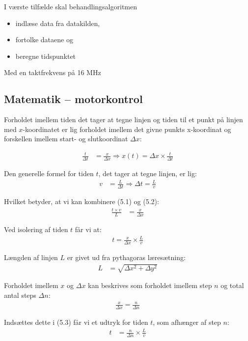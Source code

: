 I værste tilfælde skal behandlingsalgoritmen
\begin{itemize}
\item indlæse data fra datakilden,
\item fortolke dataene og
\item beregne tidspunktet
\end{itemize}

Med en taktfrekvens på 16 MHz

\subsection{Matematik -- motorkontrol}

Forholdet imellem tiden det tager at tegne linjen og tiden til et
punkt på linjen med $x$-koordinatet er lig forholdet imellem det givne
punkts x-koordinat og forskellen imellem start- og slutkoordinat $\Delta x$:

\begin{align}
\frac{t}{\Delta t} &= \frac{x}{\Delta x} \Rightarrow x(t) = \Delta x \times \frac{t}{\Delta t}
\end{align}

Den generelle formel for tiden $t$, det tager at tegne linjen, er lig:
\begin{align}
v &= \frac{L}{\Delta t} \Rightarrow \Delta t= \frac{L}{v}
\end{align}

Hvilket betyder, at vi kan kombinere (5.1) og (5.2):
\begin{align*}
\frac{t \times v}{L} &= \frac{x}{\Delta x}
\end{align*}

Ved isolering af tiden $t$ får vi at:
\begin{align}
t = \frac{x}{\Delta x} \times \frac{L}{v}
\end{align}

Længden af linjen $L$ er givet ud fra pythagoras læresætning:
\begin{align*}
L &= \sqrt{\Delta x^2+\Delta y^2}
\end{align*}

Forholdet imellem $x$ og $\Delta x$ kan beskrives som forholdet imellem step $n$ og total antal steps $\Delta n$:
\begin{align}
\frac{x}{\Delta x} = \frac{n}{\Delta n}
\end{align}

Indsættes dette i (5.3) får vi et udtryk for tiden $t$, som afhænger af step $n$:
\begin{align}
t &= \frac{n}{\Delta n} \times \frac{L}{v}
\end{align}

